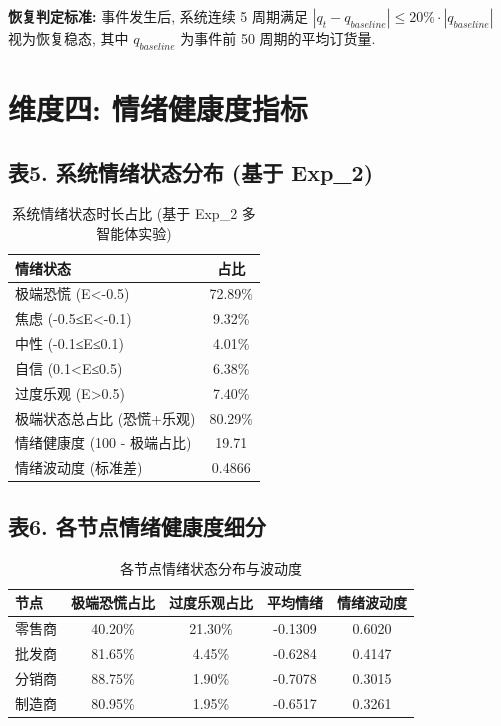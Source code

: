 \documentclass[11pt]{article}
\begin{document}
\textbf{恢复判定标准:} 事件发生后, 系统连续 5 周期满足
$|q_t - q_{baseline}| \leq 20\% \cdot |q_{baseline}|$ 视为恢复稳态,
其中 $q_{baseline}$ 为事件前 50 周期的平均订货量.

\section*{维度四: 情绪健康度指标}

\subsection*{表5. 系统情绪状态分布 (基于 Exp\_2)}

\begin{table}[h]
\centering
\caption{系统情绪状态时长占比 (基于 Exp\_2 多智能体实验)}
\label{tab:emotion_health}
\begin{tabular}{lc}
\toprule
情绪状态 & 占比 \\
\midrule
极端恐慌 (E<-0.5) & 72.89\% \\
焦虑 (-0.5≤E<-0.1) & 9.32\% \\
中性 (-0.1≤E≤0.1) & 4.01\% \\
自信 (0.1<E≤0.5) & 6.38\% \\
过度乐观 (E>0.5) & 7.40\% \\
\midrule
极端状态总占比 (恐慌+乐观) & 80.29\% \\
情绪健康度 (100 - 极端占比) & 19.71 \\
情绪波动度 (标准差) & 0.4866 \\
\bottomrule
\end{tabular}
\end{table}

\subsection*{表6. 各节点情绪健康度细分}

\begin{table}[h]
\centering
\caption{各节点情绪状态分布与波动度}
\label{tab:emotion_per_node}
\begin{tabular}{lcccc}
\toprule
节点 & 极端恐慌占比 & 过度乐观占比 & 平均情绪 & 情绪波动度 \\
\midrule
零售商 & 40.20\% & 21.30\% & -0.1309 & 0.6020 \\
批发商 & 81.65\% & 4.45\% & -0.6284 & 0.4147 \\
分销商 & 88.75\% & 1.90\% & -0.7078 & 0.3015 \\
制造商 & 80.95\% & 1.95\% & -0.6517 & 0.3261 \\
\bottomrule
\end{tabular}
\end{table}
\end{document}
